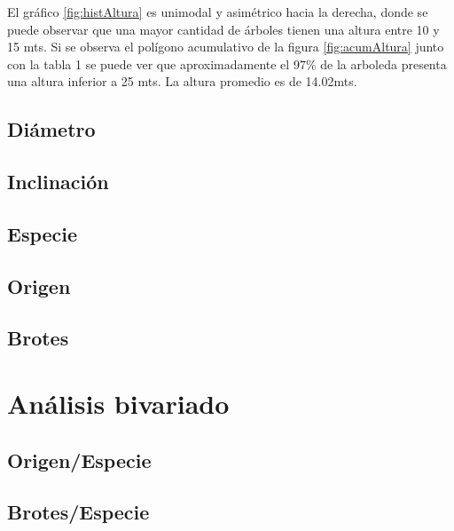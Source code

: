 \documentclass{article}
\begin{document}
El gráfico \ref{fig:histAltura} es unimodal y asimétrico hacia la derecha,
donde se puede observar
que una mayor cantidad de árboles tienen una altura entre 10 y 15 mts.
Si se observa el polígono acumulativo de la figura \ref{fig:acumAltura} 
junto con la tabla 1 se puede ver que aproximadamente el 97\% de la arboleda 
presenta una altura inferior a 25 mts. La altura promedio es de 14.02mts.

\subsection{Diámetro}
\subsection{Inclinación}
\subsection{Especie}
\subsection{Origen}
\subsection{Brotes}

\section{Análisis bivariado}
\subsection{Origen/Especie}
\subsection{Brotes/Especie}
\end{document}
